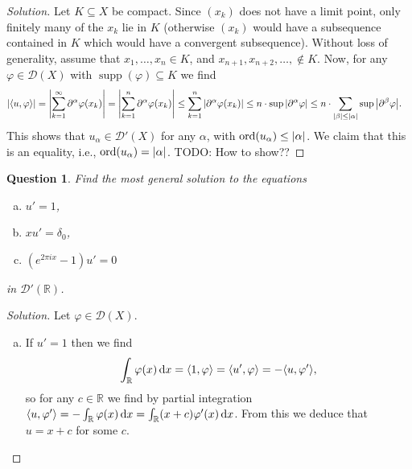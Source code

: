 \documentclass{article}
\theoremstyle{plain}
\newtheorem{question}{Question}
\theoremstyle{remark}
\newenvironment{solution}{\begin{proof}[Solution]\renewcommand\qedsymbol{}}{\end{proof}}
\renewcommand{\phi}{\varphi}
\newcommand{\Bb}{\mathbb}
\newcommand{\Cal}{\mathcal}
\newcommand{\RR}{\Bb R}
\newcommand{\DD}{\Cal D}
\DeclarePairedDelimiter{\ang}{\langle}{\rangle}
\newcommand\TODO{{\color{red} TODO: }}
\newcommand\pt\partial
\DeclareMathOperator{\supp}{supp}
\DeclareMathOperator{\ord}{ord}
\begin{document}
\begin{solution}
	Let $K \subseteq X$ be compact. Since $(x_k)$ does not have a limit point, only finitely many of the $x_k$ lie in $K$ (otherwise $(x_k)$ would have a subsequence contained in $K$ which would have a convergent subsequence). Without loss of generality, assume that $x_1, \dotsc, x_n \in K$, and $x_{n+1}, x_{n+2}, \dotsc, \notin K$. Now, for any $\phi \in \DD(X)$ with $\supp(\phi) \subseteq K$ we find
	\begin{align*}
		\abs{\ang{u, \phi}} &= \abs{\sum_{k=1}^\infty \pt^\alpha\phi(x_k)} = \abs{\sum_{k=1}^n \pt^\alpha\phi(x_k)} \leq \sum_{k=1}^n \abs{\pt^\alpha \phi(x_k)} \leq n \cdot \sup \abs{\pt^\alpha\phi} \leq n \cdot \sum_{\abs{\beta} \leq \abs{\alpha}} \sup \abs{\pt^\beta \phi}. 
	\end{align*}
	This shows that $u_\alpha \in \DD'(X)$ for any $\alpha$, with $\ord(u_\alpha) \leq \abs{\alpha}$. We claim that this is an equality, i.e., $\ord(u_\alpha) = \abs{\alpha}$. \TODO How to show??
\end{solution}

\begin{question}
	Find the most general solution to the equations
	\begin{enumerate}[(a)]
		\item $u'  = 1$,
		\item $xu' = \delta_0$,
		\item $(e^{2\pi i x} - 1)u' = 0$
	\end{enumerate}
	in $\DD'(\RR)$. 
\end{question}

\begin{solution}
	Let $\phi \in \DD(X)$. 
	\begin{enumerate}[(a)]
		\item If $u' = 1$ then we find 
		\[
		\int_\RR \phi(x) \dd{x} = \ang{1, \phi} = \ang{u', \phi} = -\ang{u, \phi'},
		\]
		so for any $c \in \RR$ we find by partial integration $\ang{u, \phi'} = - \int_\RR\phi(x) \dd{x} = \int_\RR (x + c) \phi'(x) \dd{x}$. From this we deduce that $u = x + c$ for some $c$. 
	\end{enumerate}
\end{solution}
\end{document}
